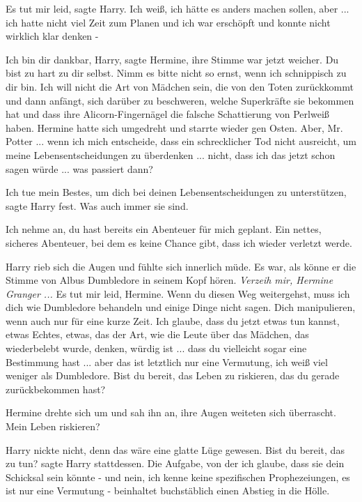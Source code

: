 \glqq{}Es tut mir leid\grqq{}, sagte Harry. \glqq{}Ich weiß, ich hätte es anders
machen sollen, aber ... ich hatte nicht viel Zeit zum Planen und ich war
erschöpft und konnte nicht wirklich klar denken -\grqq{}

\glqq{}Ich bin dir dankbar, Harry\grqq{}, sagte Hermine, ihre Stimme war jetzt
weicher. \glqq{}Du bist zu hart zu dir selbst. Nimm es bitte nicht so ernst, wenn
ich schnippisch zu dir bin. Ich will nicht die Art von Mädchen sein, die von den
Toten zurückkommt und dann anfängt, sich darüber zu beschweren, welche
Superkräfte sie bekommen hat und dass ihre Alicorn-Fingernägel die falsche
Schattierung von Perlweiß haben.\grqq{} Hermine hatte sich umgedreht und starrte
wieder gen Osten. \glqq{}Aber, Mr. Potter ... wenn ich mich entscheide, dass ein
schrecklicher Tod nicht ausreicht, um meine Lebensentscheidungen zu überdenken
... nicht, dass ich das jetzt schon sagen würde ... was passiert dann?\grqq{}

\glqq{}Ich tue mein Bestes, um dich bei deinen Lebensentscheidungen zu
unterstützen\grqq{}, sagte Harry fest. \glqq{}Was auch immer sie sind.\grqq{}

\glqq{}Ich nehme an, du hast bereits ein Abenteuer für mich geplant. Ein nettes,
sicheres Abenteuer, bei dem es keine Chance gibt, dass ich wieder verletzt
werde.\grqq{}

Harry rieb sich die Augen und fühlte sich innerlich müde. Es war, als könne er
die Stimme von Albus Dumbledore in seinem Kopf hören.
\emph{Verzeih mir, Hermine Granger ...}
\glqq{}Es tut mir leid, Hermine. Wenn du diesen Weg weitergehst, muss ich dich
wie Dumbledore behandeln und einige Dinge nicht sagen. Dich manipulieren, wenn
auch nur für eine kurze Zeit. Ich glaube, dass du jetzt etwas tun kannst, etwas
Echtes, etwas, das der Art, wie die Leute über das Mädchen, das wiederbelebt
wurde, denken, würdig ist ... dass du vielleicht sogar eine Bestimmung hast ...
aber das ist letztlich nur eine Vermutung, ich weiß viel weniger als Dumbledore.
Bist du bereit, das Leben zu riskieren, das du gerade zurückbekommen
hast?\grqq{}

Hermine drehte sich um und sah ihn an, ihre Augen weiteten sich überrascht.
\glqq{}Mein Leben riskieren?\grqq{}

Harry nickte nicht, denn das wäre eine glatte Lüge gewesen. \glqq{}Bist du
bereit, das zu tun?\grqq{} sagte Harry stattdessen. \glqq{}Die Aufgabe, von der
ich glaube, dass sie dein Schicksal sein könnte - und nein, ich kenne keine
spezifischen Prophezeiungen, es ist nur eine Vermutung - beinhaltet buchstäblich
einen Abstieg in die Hölle.\grqq{}


